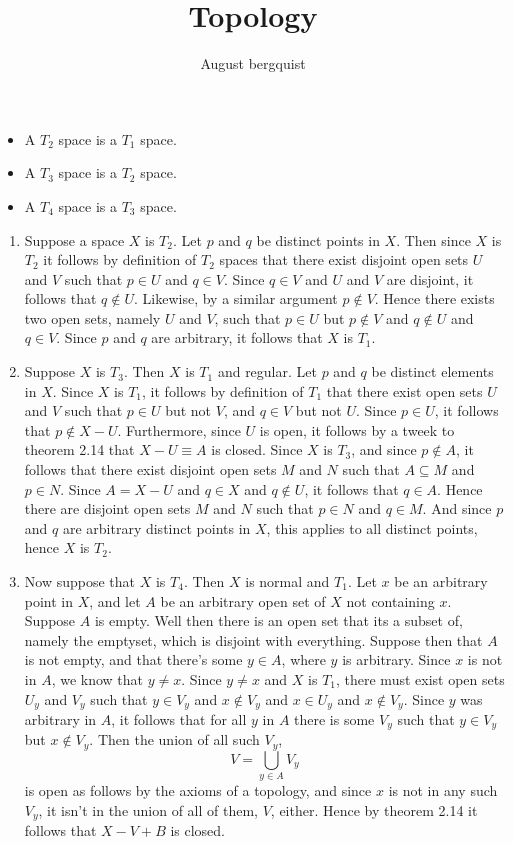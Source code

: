 \documentclass{article}
\title{Topology}
\author{August bergquist}
\begin{document}
 \begin{itemize}
    \item A $T_2$ space is a $T_1$ space.
    \item A $T_3$ space is a $T_2$ space.
    \item A $T_4$ space is a $T_3$ space.
\end{itemize}
\begin{enumerate}
    \item Suppose a space $X$ is $T_2$. Let $p$ and $q$ be distinct points in $X$. Then since $X$ is $T_2$ it follows by definition of $T_2$ spaces that there exist disjoint open sets $U$ and $V$ such that $p\in U$ and $q\in V$. Since $q\in V$ and $U$ and $V$ are disjoint, it follows that $q\not\in U$. Likewise, by a similar argument $p\not\in V$. Hence there exists two open sets, namely $U$ and $V$, such that $p\in U$ but $p\not\in V$ and $q\not\in U$ and $q\in V$. Since $p$ and $q$ are arbitrary, it follows that $X$ is $T_1$.
    \item Suppose $X$ is $T_3$. Then $X$ is $T_1$ and regular. Let $p$ and $q$ be distinct elements in $X$. Since $X$ is $T_1$, it follows by definition of $T_1$ that there exist open sets $U$ and $V$ such that $p\in U$ but not $V$, and $q\in V$ but not $U$. Since $p\in U$, it follows that $p\not\in X-U$. Furthermore, since $U$ is open, it follows by a tweek to theorem 2.14 that $X-U \equiv A $ is closed. Since $X$ is $T_3$, and since $p\not\in A$, it follows that there exist disjoint open sets $M$ and $N$ such that $A\subseteq M$ and $p\in N$. Since $A = X- U$ and $q\in X$ and $q\not\in U$, it follows that $q\in A$. Hence there are disjoint open sets $M$ and $N$ such that $p\in N$ and $q\in M$. And since $p$ and $q$ are arbitrary distinct points in $X$, this applies to all distinct points, hence $X$ is $T_2$.
    \item Now suppose that $X$ is $T_4$. Then $X$ is normal and $T_1$. Let $x$ be an arbitrary point in $X$, and let $A$ be an arbitrary open set of $X$ not containing $x$. Suppose $A$ is empty. Well then there is an open set that its a subset of, namely the emptyset, which is disjoint with everything. Suppose then that $A$ is not empty, and that there's some $y\in A$, where $y$ is arbitrary. Since $x$ is not in $A$, we know that $y\ne x$. Since $y\ne x$ and $X$ is $T_1$, there must exist open sets $ U_y $ and $V_y$ such that $y\in V_y$ and $x\not \in V_y$ and $x\in U_y$ and $x\not\in V_y$. Since $y$ was arbitrary in $A$, it follows that for all $y$ in $A$ there is some $V_y$ such that $y\in V_y$ but $x\not\in V_y$. Then the union of all such $V_y$, 
    $$V = \bigcup_{y\in A}V_y$$ is open as follows by the axioms of a topology, and since $x$ is not in any such $V_y$, it isn't in the union of all of them, $V$, either. Hence by theorem 2.14 it follows that $X- V + B$ is closed. \\
    

\end{enumerate}
\end{document}
